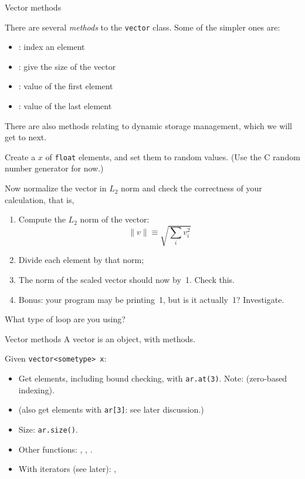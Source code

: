  {Vector methods}

There are several \emph{methods}
to the \lstinline{vector} class. Some of the simpler ones are:
\begin{itemize}
\item {}: index an element
\item {}: give the size of the vector
\item {}: value of the first element
\item {}: value of the last element
\end{itemize}

There are also methods relating to dynamic storage management, which
we will get to next.

\begin{exercise}
  \label{ex:vectornormalize}
  Create a  $x$ of \lstinline{float} elements, and set them to random
  values. (Use the C random number generator for now.)

  Now normalize the vector in $L_2$ norm and check the correctness of
  your calculation, that is,
  \begin{enumerate}
  \item Compute the $L_2$ norm of the vector:
    \[ \| v\| \equiv \sqrt{\sum_iv_i^2} \]
  \item Divide each element by that norm;
  \item The norm of the scaled vector should now by~1. Check this.
  \item Bonus: your program may be printing~1, but is it actually~1?
    Investigate.
  \end{enumerate}
  What type of loop are you using?
\end{exercise}


\begin{slide}{Vector methods}
  \label{sl:vector-method}
  A vector is an object, with methods.

  Given \lstinline+vector<sometype> x+:
  \begin{itemize}
  \item Get elements, including bound checking, with
    \lstinline{ar.at(3)}.
    Note: (zero-based indexing).
  \item (also get elements with \lstinline{ar[3]}: see later discussion.)
  \item Size: \lstinline{ar.size()}.
  \item Other functions: , , .
  \item With iterators (see later): , 
  \end{itemize}
\end{slide}

